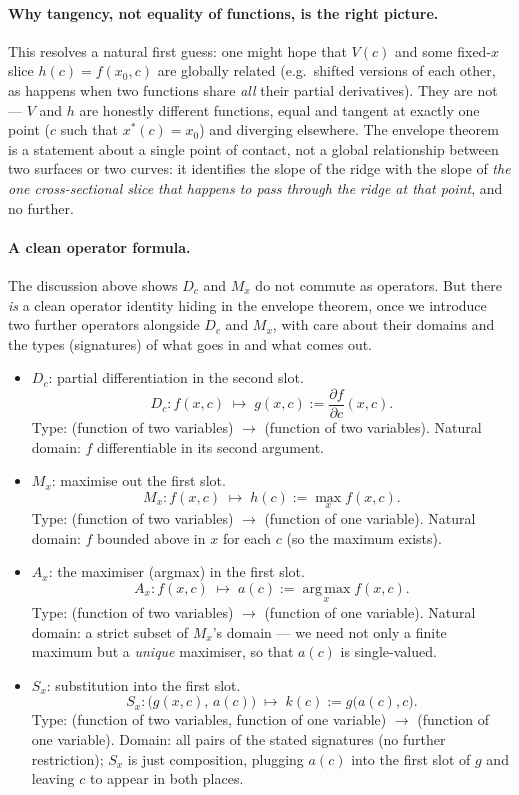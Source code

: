 \documentclass[a4paper,oneside,12pt]{extarticle}
\theoremstyle{plain}
\theoremstyle{definition}
\theoremstyle{remark}
\begin{document}
\paragraph{Why tangency, not equality of functions, is the right
picture.}
This resolves a natural first guess: one might hope that $V(c)$ and
some fixed-$x$ slice $h(c)=f(x_0,c)$ are globally related (e.g.\
shifted versions of each other, as happens when two functions share
\emph{all} their partial derivatives).  They are not --- $V$ and $h$
are honestly different functions, equal and tangent at exactly one
point ($c$ such that $x^*(c)=x_0$) and diverging elsewhere.  The
envelope theorem is a statement about a single point of contact,
not a global relationship between two surfaces or two curves: it
identifies the slope of the ridge with the slope of \emph{the one
cross-sectional slice that happens to pass through the ridge at
that point}, and no further.

\paragraph{A clean operator formula.}
The discussion above shows $D_c$ and $M_x$ do not commute as
operators.  But there \emph{is} a clean operator identity hiding in
the envelope theorem, once we introduce two further operators
alongside $D_c$ and $M_x$, with care about their domains and the
types (signatures) of what goes in and what comes out.

\begin{itemize}
\item $D_c$: partial differentiation in the second slot.
  \[
    D_c : f(x,c) \;\longmapsto\; g(x,c) := \frac{\partial f}{\partial c}(x,c).
  \]
  Type: (function of two variables) $\to$ (function of two
  variables).  Natural domain: $f$ differentiable in its second
  argument.

\item $M_x$: maximise out the first slot.
  \[
    M_x : f(x,c) \;\longmapsto\; h(c) := \max_x f(x,c).
  \]
  Type: (function of two variables) $\to$ (function of one
  variable).  Natural domain: $f$ bounded above in $x$ for each $c$
  (so the maximum exists).

\item $A_x$: the maximiser (argmax) in the first slot.
  \[
    A_x : f(x,c) \;\longmapsto\; a(c) := \operatorname*{arg\,max}_x f(x,c).
  \]
  Type: (function of two variables) $\to$ (function of one
  variable).  Natural domain: a strict subset of $M_x$'s domain ---
  we need not only a finite maximum but a \emph{unique} maximiser,
  so that $a(c)$ is single-valued.

\item $S_x$: substitution into the first slot.
  \[
    S_x : \big(g(x,c),\, a(c)\big) \;\longmapsto\; k(c) := g\big(a(c),c\big).
  \]
  Type: (function of two variables, function of one variable) $\to$
  (function of one variable).  Domain: all pairs of the stated
  signatures (no further restriction); $S_x$ is just composition,
  plugging $a(c)$ into the first slot of $g$ and leaving $c$ to
  appear in both places.
\end{itemize}
\end{document}
